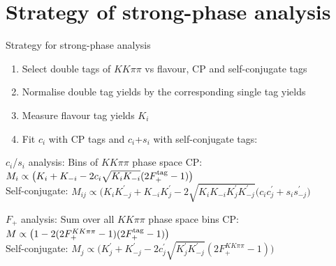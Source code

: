 \documentclass{beamer}
\begin{document}
\section{Strategy of strong-phase analysis}
\begin{frame}{Strategy for strong-phase analysis}
  \begin{enumerate}
    \setlength\itemsep{0.5em}
    \item{Select double tags of $KK\pi\pi$ vs flavour, CP and self-conjugate tags}
    \item{Normalise double tag yields by the corresponding single tag yields}
    \item{Measure flavour tag yields $K_i$}
    \item{Fit $c_i$ with CP tags and $c_i$+$s_i$ with self-conjugate tags:}
  \end{enumerate}
  \begin{block}{$c_i$/$s_i$ analysis: Bins of $KK\pi\pi$ phase space}
    CP: $M_i\propto\big(K_i + K_{-i} - 2c_i\sqrt{K_iK_{-i}}(2F_+^{\rm tag} - 1)\big)$ \\
    Self-conjugate: $M_{ij}\propto\big(K_iK_{-j}^\prime + K_{-i}K_j^\prime - 2\sqrt{K_iK_{-i}K_j^\prime K_{-j}^\prime}(c_ic_j^\prime + s_is_{-j}^\prime\big)$
  \end{block}
  \begin{block}{$F_+$ analysis: Sum over all $KK\pi\pi$ phase space bins}
    CP: $M\propto\big(1 - 2(2F_+^{KK\pi\pi} - 1)(2F_+^{\rm tag} - 1)\big)$ \\
    Self-conjugate: $M_j\propto\big(K_j^\prime + K_{-j}^\prime - 2c_j^{\prime}\sqrt{K_j^\prime K_{-j}^\prime}(2F_+^{KK\pi\pi} - 1)\big)$
  \end{block}
\end{frame}
\end{document}

